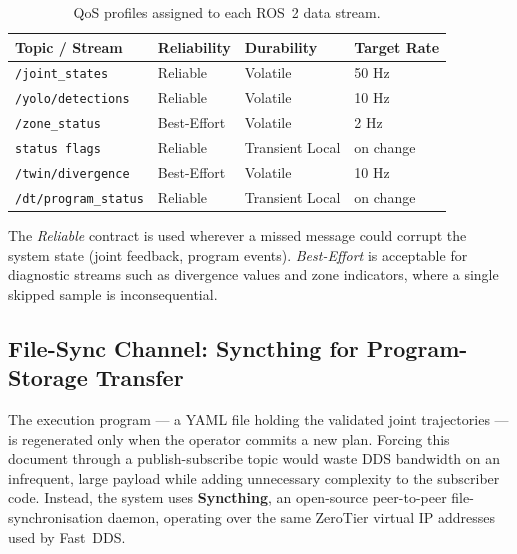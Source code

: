 \begin{table}[H]
\centering
\caption{QoS profiles assigned to each ROS~2 data stream.}
\label{tab:ch6_qos}
\setlength{\tabcolsep}{6pt}
\begin{tabular}{llll}
\toprule
\textbf{Topic / Stream} & \textbf{Reliability} & \textbf{Durability} & \textbf{Target Rate} \\
\midrule
\texttt{/joint\_states}           & Reliable    & Volatile      & 50 Hz  \\
\texttt{/yolo/detections}         & Reliable    & Volatile      & 10 Hz  \\
\texttt{/zone\_status}            & Best-Effort & Volatile      & 2 Hz   \\
\texttt{status flags}             & Reliable    & Transient Local & on change \\
\texttt{/twin/divergence}         & Best-Effort & Volatile      & 10 Hz  \\
\texttt{/dt/program\_status}      & Reliable    & Transient Local & on change \\
\bottomrule
\end{tabular}
\end{table}

The \emph{Reliable} contract is used wherever a missed message could corrupt the system state
(joint feedback, program events).  \emph{Best-Effort} is acceptable for diagnostic streams such
as divergence values and zone indicators, where a single skipped sample is inconsequential.

\subsection{File-Sync Channel: Syncthing for Program-Storage Transfer}
\label{subsec:ch6_syncthing}

The execution program — a YAML file holding the validated joint trajectories — is regenerated
only when the operator commits a new plan.  Forcing this document through a publish-subscribe
topic would waste DDS bandwidth on an infrequent, large payload while adding unnecessary
complexity to the subscriber code.  Instead, the system uses \textbf{Syncthing}, an open-source
peer-to-peer file-synchronisation daemon, operating over the same ZeroTier virtual IP addresses
used by Fast~DDS.

